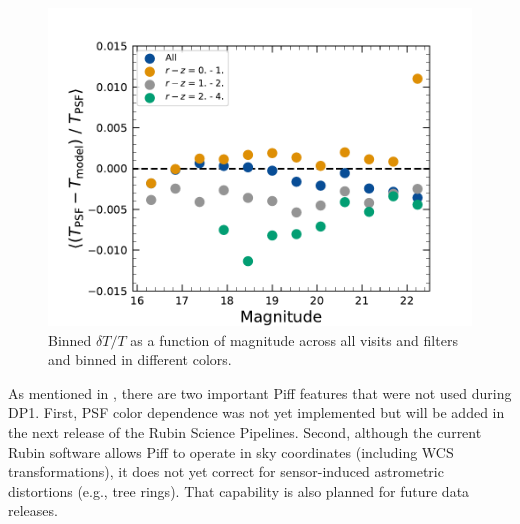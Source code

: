 \begin{figure}[htb!]
\centering
\includegraphics[width=0.98\linewidth]{dT_T_Piff_poly_4_vs_mag.pdf}
\caption{Binned $\delta T/T$ as a function of magnitude across
all visits and filters and binned in different colors.}
\label{fig:psf_residuals_mag_color}
\vspace{0.1cm}
\end{figure}

As mentioned in \cite{PSTN-019}, there are two important Piff features that 
were not used during DP1. First, PSF color dependence was not yet implemented 
but will be added in the next release of the Rubin Science Pipelines. Second, 
although the current Rubin software allows Piff to operate in sky coordinates 
(including WCS transformations), it does not yet correct for sensor-induced 
astrometric distortions (e.g., tree rings). That capability is also planned 
for future data releases.


